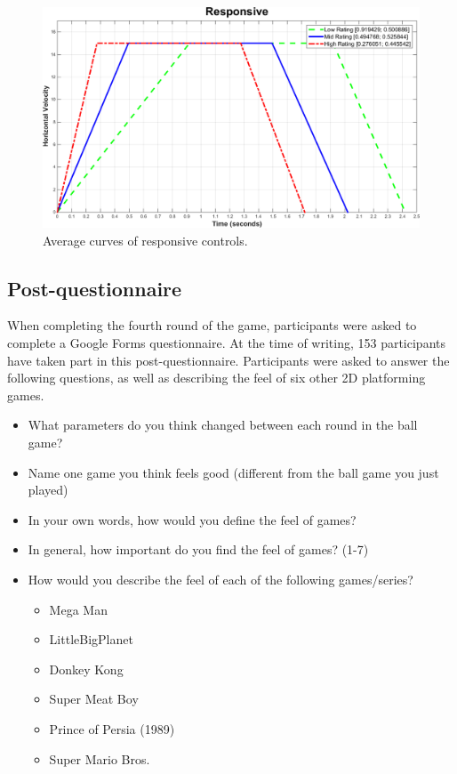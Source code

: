 \begin{figure}[htbp]
\centering
\includegraphics[width=0.9\columnwidth]{Pics/Curves/Responsive_curve}
\caption{Average curves of responsive controls.}
\label{fig:curve_responsive}
\end{figure}

\subsection{Post-questionnaire}
When completing the fourth round of the game, participants were asked to complete a Google Forms questionnaire. At the time of writing, 153 participants have taken part in this post-questionnaire. Participants were asked to answer the following questions, as well as describing the feel of six other 2D platforming games.
\begin{itemize}[noitemsep,nolistsep]
\item What parameters do you think changed between each round in the ball game?
\item Name one game you think feels good (different from the ball game you just played)
\item In your own words, how would you define the feel of games?
\item In general, how important do you find the feel of games? (1-7)
\item How would you describe the feel of each of the following games/series?
\begin{itemize}[noitemsep,nolistsep]
\item Mega Man
\item LittleBigPlanet
\item Donkey Kong
\item Super Meat Boy
\item Prince of Persia (1989)
\item Super Mario Bros.
\end{itemize}
\end{itemize}

